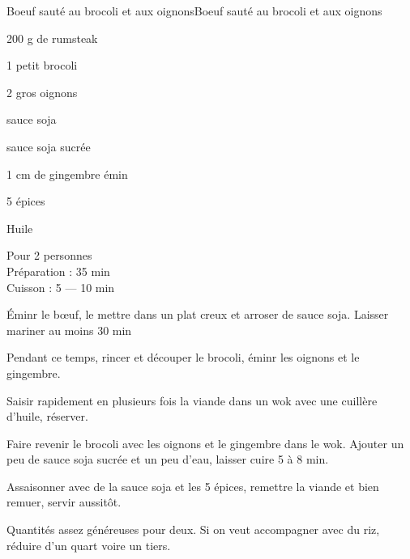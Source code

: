 \begin{recette}{Boeuf sauté au brocoli et aux oignons}{Boeuf sauté au brocoli et aux oignons}

\begin{ingredients}
200 g de rumsteak\par
1 petit brocoli\par
2 gros oignons\par
sauce soja\par
sauce soja sucrée\par
1 cm de gingembre émin\par
5 épices\par
Huile\par
\end{ingredients}

\begin{infos}
Pour 2 personnes\\
Préparation : 35 min\\
Cuisson : 5 --- 10 min\\
\end{infos}

\begin{etapes}
\item Éminr le bœuf, le mettre dans un plat creux et arroser de sauce soja. Laisser mariner au moins 30 min
\item Pendant ce temps, rincer et découper le brocoli, éminr les oignons et le gingembre.
\item Saisir rapidement en plusieurs fois la viande dans un wok avec une cuillère d'huile, réserver.
\item Faire revenir le brocoli avec les oignons et le gingembre dans le wok. Ajouter un peu de sauce soja sucrée et un peu d'eau, laisser cuire 5 à 8 min.
\item Assaisonner avec de la sauce soja et les 5 épices, remettre la viande et bien remuer, servir aussitôt.
\end{etapes}

\begin{conseils}
Quantités assez généreuses pour deux. Si on veut accompagner avec du riz, réduire d'un quart voire un tiers.
\end{conseils}

\end{recette}